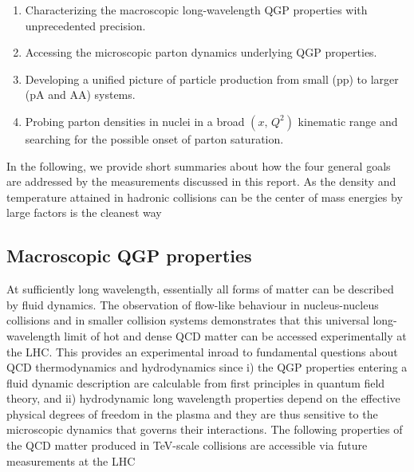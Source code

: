 \documentclass[../report.tex]{subfiles}
\begin{document}
\begin{enumerate}
\item Characterizing the macroscopic long-wavelength QGP properties with unprecedented precision. 
\item Accessing the microscopic parton dynamics underlying QGP properties.
\item Developing a unified picture of particle production from small (pp) to larger (pA and AA) systems.
\item Probing parton densities in nuclei in a broad $(x,\,Q^2)$ kinematic range and searching for the possible onset of parton saturation.
\end{enumerate}
 
In the following, we provide short summaries about how the four general goals are addressed by the measurements discussed in this report. As the density and temperature attained in hadronic collisions can be  the center of mass energies by large factors is the cleanest way  

\subsection{Macroscopic QGP properties}
At sufficiently long wavelength, essentially all forms of matter can be described by fluid dynamics. The observation of flow-like behaviour in nucleus-nucleus collisions and in smaller collision systems demonstrates that this universal long-wavelength limit of hot and dense QCD matter can be accessed experimentally at the LHC. This provides an experimental inroad to fundamental questions about QCD thermodynamics and hydrodynamics since i) the QGP properties entering a fluid dynamic description are calculable from first principles in quantum field theory, and ii) hydrodynamic long wavelength properties depend on the effective physical degrees of freedom in the plasma and they are thus sensitive to the microscopic dynamics that governs their interactions. The following properties of the QCD matter produced in TeV-scale collisions
are accessible via future measurements at the LHC
\end{document}
